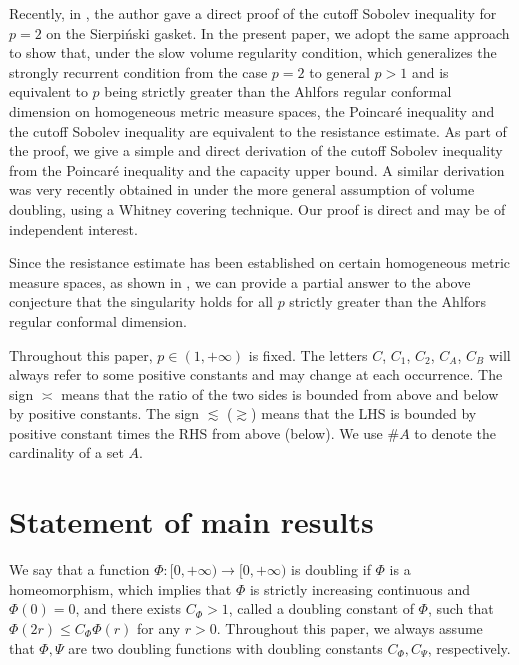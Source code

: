 \documentclass[11pt,a4paper]{article}
\numberwithin{equation}{section}
\theoremstyle{plain}
\theoremstyle{definition}
\begin{document}
Recently, in \cite{Yan25b}, the author gave a direct proof of the cutoff Sobolev inequality for $p=2$ on the Sierpi\'nski gasket. In the present paper, we adopt the same approach to show that, under the slow volume regularity condition, which generalizes the strongly recurrent condition from the case $p=2$ to general $p>1$ and is equivalent to $p$ being strictly greater than the Ahlfors regular conformal dimension on homogeneous metric measure spaces, the Poincar\'e inequality and the cutoff Sobolev inequality are equivalent to the resistance estimate. As part of the proof, we give a simple and direct derivation of the cutoff Sobolev inequality from the Poincar\'e inequality and the capacity upper bound. A similar derivation was very recently obtained in \cite{Eri26} under the more general assumption of volume doubling, using a Whitney covering technique. Our proof is direct and may be of independent interest.

Since the resistance estimate has been established on certain homogeneous metric measure spaces, as shown in \cite{Kig23,KS24a}, we can provide a partial answer to the above conjecture that the singularity holds for all $p$ strictly greater than the Ahlfors regular conformal dimension.

Throughout this paper, $p\in(1,+\infty)$ is fixed. The letters $C$, $C_1$, $C_2$, $C_A$, $C_B$ will always refer to some positive constants and may change at each occurrence. The sign $\asymp$ means that the ratio of the two sides is bounded from above and below by positive constants. The sign $\lesssim$ ($\gtrsim$) means that the LHS is bounded by positive constant times the RHS from above (below). We use $\#A$ to denote the cardinality of a set $A$.

\section{Statement of main results}

We say that a function $\Phi:[0,+\infty)\to[0,+\infty)$ is doubling if $\Phi$ is a homeomorphism, which implies that $\Phi$ is strictly increasing continuous and $\Phi(0)=0$, and there exists $C_\Phi>1$, called a doubling constant of $\Phi$, such that $\Phi(2r)\le C_\Phi\Phi(r)$ for any $r>0$. Throughout this paper, we always assume that $\Phi, \Psi$ are two doubling functions with doubling constants $C_\Phi, C_\Psi$, respectively.
\end{document}

